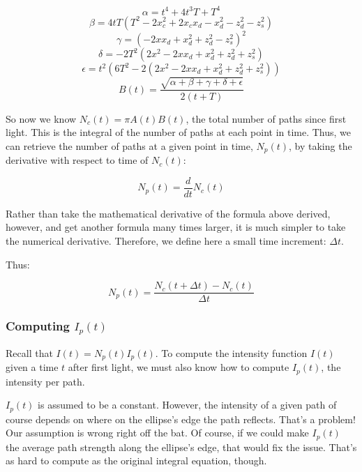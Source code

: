\documentclass[11pt]{article}
\begin{document}
\begin{equation}
    \alpha = t^4 + 4t^3 T + T^4
\end{equation}
\begin{equation}
    \beta = 4tT(T^2 - 2x_c^2 + 2x_c x_d - x_d^2 - z_d^2 - z_s^2)
\end{equation}
\begin{equation}
    \gamma = (-2xx_d + x_d^2 + z_d^2 - z_s^2)^2
\end{equation}
\begin{equation}
    \delta = -2T^2(2x^2 - 2xx_d + x_d^2 + z_d^2 + z_s^2)
\end{equation}
\begin{equation}
    \epsilon = t^2(6T^2 - 2(2x^2 - 2xx_d+x_d^2 + z_d^2 + z_s^2))
\end{equation}
\begin{equation}
    B(t) = \frac{\sqrt{\alpha + \beta + \gamma + \delta + \epsilon}}{2(t+T)}
\end{equation}

So now we know $N_c(t) = \pi A(t) B(t)$, the total number of paths since first light. This is the integral of the number of paths at each point in time. Thus, we can retrieve the number of paths at a given point in time, $N_p(t)$, by taking the derivative with respect to time of $N_c(t)$:

\begin{equation}
    N_p(t) = \frac{d}{dt}N_c(t)
\end{equation}

Rather than take the mathematical derivative of the formula above derived, however, and get another formula many times larger, it is much simpler to take the numerical derivative. Therefore, we define here a small time increment: $\Delta t$.

Thus:

\begin{equation}
    N_p(t) = \frac{N_c(t + \Delta t) - N_c(t)}{\Delta t}
\end{equation}

\subsubsection{Computing $I_p(t)$} \label{sec:intensityperpath}

Recall that $I(t) = N_p(t) I_p(t)$. To compute the intensity function $I(t)$ given a time $t$ after first light, we must also know how to compute $I_p(t)$, the intensity per path.

$I_p(t)$ is assumed to be a constant. However, the intensity of a given path of course depends on where on the ellipse's edge the path reflects. That's a problem! Our assumption is wrong right off the bat. Of course, if we could make $I_p(t)$ the average path strength along the ellipse's edge, that would fix the issue. That's as hard to compute as the original integral equation, though.
\end{document}
